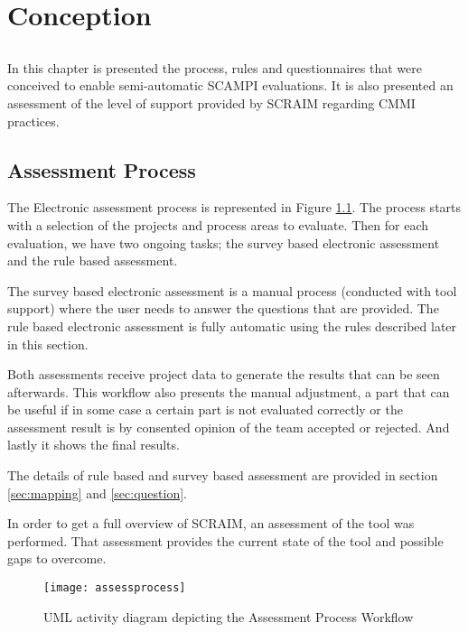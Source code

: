 \chapter{Conception} \label{chap:conception}

\section*{}

In this chapter is presented the process, rules and questionnaires that were conceived to enable semi-automatic SCAMPI evaluations. It is also presented an assessment of the level of support provided by SCRAIM regarding CMMI practices.

\section{Assessment Process} \label{sec:Approach}

The Electronic assessment process is represented in Figure \ref{fig:assessmentprocess}.
The process starts with a selection of the projects and process areas to evaluate. Then for each evaluation, we have two ongoing tasks; the survey based electronic assessment and the rule based assessment.

The survey based electronic assessment is a manual process (conducted with tool support) where the user needs to answer the questions that are provided. The rule based electronic assessment is fully automatic using the rules described later in this section.

Both assessments receive project data to generate the results that can be seen afterwards. This workflow also presents the manual adjustment, a part that can be useful if in some case a certain part is not evaluated correctly or the assessment result is by consented opinion of the team accepted or rejected. And lastly it shows the final results. 

The details of rule based and survey based assessment are provided in section \ref{sec:mapping} and \ref{sec:question}.

In order to get a full overview of SCRAIM, an assessment of the tool was performed. That assessment provides the current state of the tool and possible gaps to overcome.

\newpage
	\begin{figure}[H]
		\begin{center}
			\leavevmode
			\texttt{[image: assessprocess]}
			\caption{UML activity diagram depicting the Assessment Process Workflow}
			\label{fig:assessmentprocess}
		\end{center}
	\end{figure}


